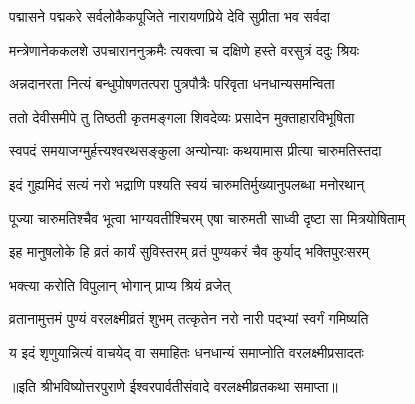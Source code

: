 \twolineshloka
{पद्मासने पद्मकरे सर्वलोकैकपूजिते}
{नारायणप्रिये देवि सुप्रीता भव सर्वदा} %

\twolineshloka
{मन्त्रेणानेककलशे उपचाराननुक्रमैः}
{त्यक्त्वा च दक्षिणे हस्ते वरसुत्रं ददुः श्रियः} %

\twolineshloka
{अन्नदानरता नित्यं बन्धुपोषणतत्परा}
{पुत्रपौत्रैः परिवृता धनधान्यसमन्विता} %

\twolineshloka
{ततो देवीसमीपे तु तिष्ठती कृतमङ्गला}
{शिवदेव्यः प्रसादेन मुक्ताहारविभूषिता} %

\twolineshloka
{स्वपदं समयाजग्मुर्हत्त्यश्वरथसङ्कुला}
{अन्योन्याः कथयामास प्रीत्या चारुमतिस्तदा} %

\twolineshloka
{इदं गुह्यमिदं सत्यं नरो भद्राणि पश्यति}
{स्वयं चारुमतिर्मुख्यानुपलब्धा मनोरथान्} %

\twolineshloka
{पूज्या चारुमतिश्चैव भूत्वा भाग्यवतीश्चिरम्}
{एषा चारुमती साध्वी दृष्टा सा मित्रयोषिताम्} %

\twolineshloka
{इह मानुषलोके हि व्रतं कार्यं सुविस्तरम्}
{व्रतं पुण्यकरं चैव कुर्याद् भक्तिपुरःसरम्} %

\twolineshloka
{भक्त्या करोति विपुलान्}
{भोगान् प्राप्य श्रियं व्रजेत्} %

\twolineshloka
{व्रतानामुत्तमं पुण्यं वरलक्ष्मीव्रतं शुभम्}
{तत्कृतेन नरो नारी पद्भ्यां स्वर्गं गमिष्यति} %

\twolineshloka
{य इदं शृणुयान्नित्यं वाचयेद् वा समाहितः}
{धनधान्यं समाप्नोति वरलक्ष्मीप्रसादतः} %

॥इति श्रीभविष्योत्तरपुराणे ईश्वरपार्वतीसंवादे वरलक्ष्मीव्रतकथा समाप्ता॥
